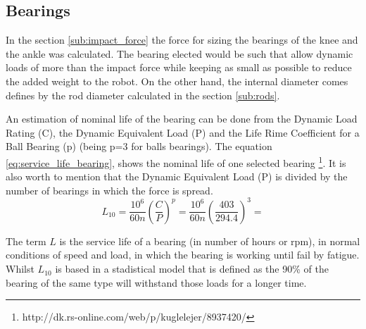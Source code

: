
\subsection{Bearings} %
\label{sub:bearings}
In the section \ref{sub:impact_force} the force for sizing the bearings of the knee and the ankle was calculated.
The bearing elected would be such that allow dynamic loads of more than the impact force while keeping as small as possible to reduce the added weight to the robot.
On the other hand, the internal diameter comes defines by the rod diameter calculated in the section \ref{sub:rods}.

An estimation of nominal life of the bearing can be done from the Dynamic Load Rating (C), the Dynamic Equivalent Load (P) and the Life Rime Coefficient for a Ball Bearing (p) (being p=3 for balls bearings).
The equation \ref{eq:service_life_bearing}, shows the nominal life of one selected bearing \footnote{http://dk.rs-online.com/web/p/kuglelejer/8937420/}.
It is also worth to mention that the Dynamic Equivalent Load (P) is divided by the number of bearings in which the force is spread.
\begin{equation}
  \label{eq:service_life_bearing}
  L_{10} = \frac{10^{6}}{60 n} \left(\frac{C}{P}\right)^{p} = \frac{10^{6}}{60 n} \left(\frac{403}{294.4}\right)^{3} = 
\end{equation}

The term $L$ is the service life of a bearing (in number of hours or rpm), in normal conditions of speed and load, in which the bearing is working until fail by fatigue. 
Whilst $L_{10}$ is based in a stadistical model that is defined as the 90\% of the bearing of the same type will withstand those loads for a longer time.
